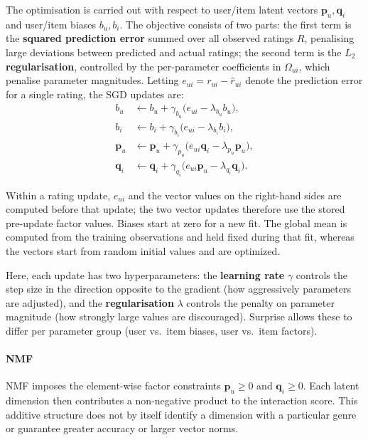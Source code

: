 \documentclass[information,article,submit,pdftex,moreauthors]{Definitions/mdpi}
\begin{document}
The optimisation is carried out with respect to user/item latent vectors $\mathbf{p}_u,\mathbf{q}_i$ and user/item biases $b_u,b_i$. The objective consists of two parts: the first term is the \textbf{squared prediction error} summed over all observed ratings $R$, penalising large deviations between predicted and actual ratings; the second term is the \textbf{$L_2$ regularisation}, controlled by the per-parameter coefficients in $\Omega_{ui}$, which penalise parameter magnitudes. Letting $e_{ui}=r_{ui}-\hat{r}_{ui}$ denote the prediction error for a single rating, the SGD updates are:
\begin{equation}
\label{eq:svd_updates}
\begin{aligned}
b_u &\leftarrow b_u + \gamma_{b_u}\bigl(e_{ui} - \lambda_{b_u} b_u\bigr),\\
b_i &\leftarrow b_i + \gamma_{b_i}\bigl(e_{ui} - \lambda_{b_i} b_i\bigr),\\
\mathbf{p}_u &\leftarrow \mathbf{p}_u + \gamma_{p_u}\bigl(e_{ui}\mathbf{q}_i - \lambda_{p_u}\mathbf{p}_u\bigr),\\
\mathbf{q}_i &\leftarrow \mathbf{q}_i + \gamma_{q_i}\bigl(e_{ui}\mathbf{p}_u - \lambda_{q_i}\mathbf{q}_i\bigr).
\end{aligned}
\end{equation}

Within a rating update, $e_{ui}$ and the vector values on the right-hand sides are computed before that update; the two vector updates therefore use the stored pre-update factor values. Biases start at zero for a new fit. The global mean is computed from the training observations and held fixed during that fit, whereas the vectors start from random initial values and are optimized.

Here, each update has two hyperparameters: the \textbf{learning rate} $\gamma$ controls the step size in the direction opposite to the gradient (how aggressively parameters are adjusted), and the \textbf{regularisation} $\lambda$ controls the penalty on parameter magnitude (how strongly large values are discouraged). Surprise allows these to differ per parameter group (user vs.\ item biases, user vs.\ item factors).

\paragraph{NMF}

NMF imposes the element-wise factor constraints $\mathbf p_u\ge0$ and $\mathbf q_i\ge0$. Each latent dimension then contributes a non-negative product to the interaction score. This additive structure does not by itself identify a dimension with a particular genre or guarantee greater accuracy or larger vector norms.
\end{document}
